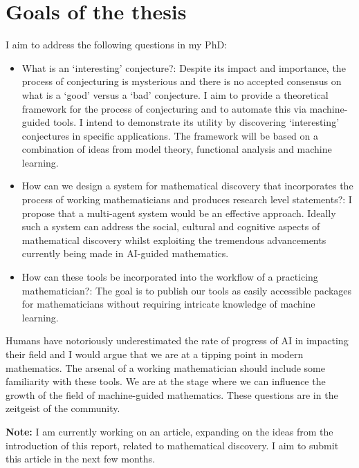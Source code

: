 \section{Goals of the thesis}
\label{sec:goals}
I aim to address the following questions in my PhD:
\begin{itemize}
    \item What is an `interesting' conjecture?: Despite its impact and importance, the process of conjecturing is mysterious and there is no accepted consensus on what is a `good' versus a `bad' conjecture. 
    I aim to provide a theoretical framework for the process of conjecturing and to automate this via machine-guided tools. I intend to demonstrate its utility by discovering `interesting' conjectures in specific applications. The framework will be based on a combination of ideas from model theory, functional analysis and machine learning.
    \item How can we design a system for mathematical discovery that incorporates the process of working mathematicians and produces research level statements?: I propose that a multi-agent system would be an effective approach. Ideally such a system can address the social, cultural and cognitive aspects of mathematical discovery whilst exploiting the tremendous advancements currently being made in AI-guided mathematics.
    \item How can these tools be incorporated into the workflow of a practicing mathematician?: The goal is to publish our tools as easily accessible packages for mathematicians without requiring intricate knowledge of machine learning. 
\end{itemize}

Humans have notoriously underestimated the rate of progress of AI in impacting their field and I would argue that we are at a tipping point in modern mathematics. The arsenal of a working mathematician should include some familiarity with these tools. We are at the stage where we can influence the growth of the field of machine-guided mathematics. These questions are in the zeitgeist of the community.

\par
\textbf{Note:} \label{intro:article} I am currently working on an article, expanding on the ideas from the introduction of this report, related to mathematical discovery. I aim to submit this article in the next few months.
